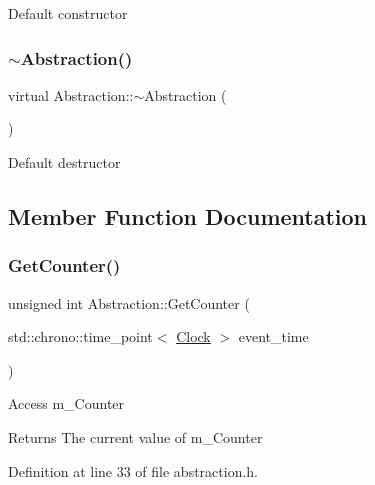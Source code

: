 Default constructor \mbox{\label{class_abstraction_aaf7d34417ea08792cc2b9449f9bfdc8e}} 
\subsubsection{\texorpdfstring{$\sim$\+Abstraction()}{~Abstraction()}}
{\footnotesize\ttfamily virtual Abstraction\+::$\sim$\+Abstraction (\begin{DoxyParamCaption}{ }\end{DoxyParamCaption})\hspace{0.3cm}{\ttfamily [virtual]}}

Default destructor 

\subsection{Member Function Documentation}
\mbox{\label{class_abstraction_a2b5e781d95a843a67db307b431f419a7}} 
\subsubsection{\texorpdfstring{Get\+Counter()}{GetCounter()}}
{\footnotesize\ttfamily unsigned int Abstraction\+::\+Get\+Counter (\begin{DoxyParamCaption}\item[{std\+::chrono\+::time\+\_\+point$<$ \mbox{\hyperlink{universe_8h_a0ef8d951d1ca5ab3cfaf7ab4c7a6fd80}{Clock}} $>$}]{event\+\_\+time }\end{DoxyParamCaption})\hspace{0.3cm}{\ttfamily [inline]}}

Access m\+\_\+\+Counter \begin{DoxyReturn}{Returns}
The current value of m\+\_\+\+Counter 
\end{DoxyReturn}


Definition at line 33 of file abstraction.\+h.

\mbox{\label{class_abstraction_a82cd32bf3de41f35ab76d80611fe6763}} 
